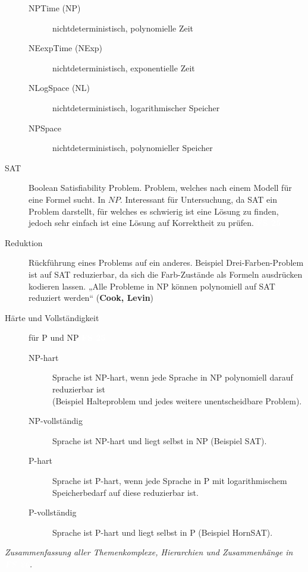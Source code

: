 \documentclass[a4paper,10pt]{article}
\newcommand{\vl}[1]{\colorbox{vl}{\textcolor{white}{\small\textbf{#1}}}}
\newcommand{\f}[1]{\textbf{#1}}
\begin{document}
\begin{description}
\begin{description}
                \item[NPTime (NP)] nichtdeterministisch, polynomielle Zeit
                \item[NEexpTime (NExp)] nichtdeterministisch, exponentielle Zeit
                \item[NLogSpace (NL)] nichtdeterministisch, logarithmischer Speicher
                \item[NPSpace] nichtdeterministisch, polynomieller Speicher
            \end{description}

        \item[SAT] Boolean Satisfiability Problem. Problem, welches nach einem Modell für eine Formel sucht. In $NP$.
            Interessant für Untersuchung, da SAT ein Problem darstellt, für welches es schwierig ist eine Lösung zu finden,
            jedoch sehr einfach ist eine Lösung auf Korrektheit zu prüfen. \vl{FS 25}

        \item[Reduktion] Rückführung eines Problems auf ein anderes. Beispiel Drei-Farben-Problem ist auf SAT reduzierbar, da sich die Farb-Zustände als
            Formeln ausdrücken kodieren lassen. „Alle Probleme in NP können polynomiell auf SAT reduziert werden“ (\f{Cook, Levin})

        \item[Härte und Vollständigkeit] für P und NP \vl{FS 25}
            \begin{description}
                \item[NP-hart] Sprache ist NP-hart, wenn jede Sprache in NP polynomiell darauf reduzierbar ist \\
                    (Beispiel Halteproblem und jedes weitere unentscheidbare Problem).
                \item[NP-vollständig] Sprache ist NP-hart und liegt selbst in NP (Beispiel SAT).

                \item[P-hart] Sprache ist P-hart, wenn jede Sprache in P mit logarithmischem Speicherbedarf auf diese reduzierbar ist.
                \item[P-vollständig] Sprache ist P-hart und liegt selbst in P (Beispiel HornSAT).
            \end{description}
    \end{description}

    \textit{Zusammenfassung aller Themenkomplexe, Hierarchien und Zusammenhänge in \vl{FS 26}.}
\end{document}
